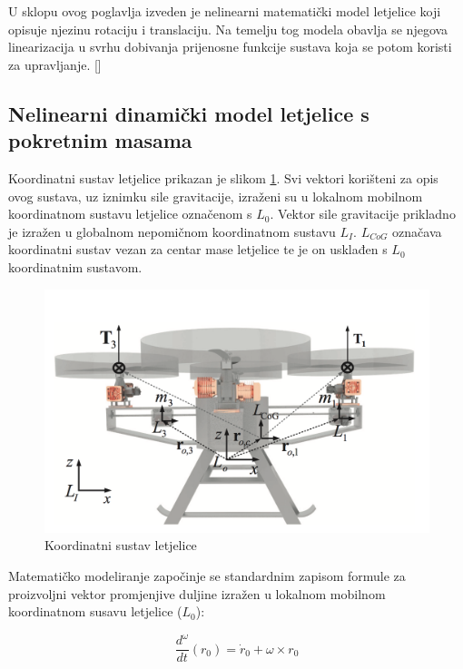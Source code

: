 \documentclass[11pt,a4paper]{article}
\begin{document}
U sklopu ovog poglavlja izveden je nelinearni matematički model letjelice koji opisuje njezinu rotaciju i translaciju. Na temelju tog modela obavlja se njegova linearizacija u svrhu dobivanja prijenosne funkcije sustava koja se potom koristi za upravljanje. [\cite{haus3}]

\medskip

\subsection{Nelinearni dinamički model letjelice s pokretnim masama}

Koordinatni sustav letjelice prikazan je slikom \ref{fig:mod}. Svi vektori korišteni za opis ovog sustava, uz iznimku sile gravitacije, izraženi su u lokalnom mobilnom koordinatnom sustavu letjelice označenom s $L_{0}$. Vektor sile gravitacije prikladno je izražen u globalnom nepomičnom koordinatnom sustavu $L_{I}$. $L_{CoG}$ označava koordinatni sustav vezan za centar mase letjelice te je on usklađen s $L_{0}$ koordinatnim sustavom.


\begin{figure}[H]
	\centering
	\includegraphics[scale=0.23]{model}
	\caption{Koordinatni sustav letjelice \cite{haus1}}
	\label{fig:mod}
\end{figure}

Matematičko modeliranje započinje se standardnim zapisom formule za proizvoljni vektor promjenjive duljine izražen u lokalnom mobilnom koordinatnom susavu letjelice ($L_{0}$):

\begin{equation}
\frac{d^{\omega}}{dt}({r}_{0}) =  {\dot{r}}_{0} + {\omega} \times {r}_{0} 
\label{eq:r0}
\end{equation}
\end{document}
